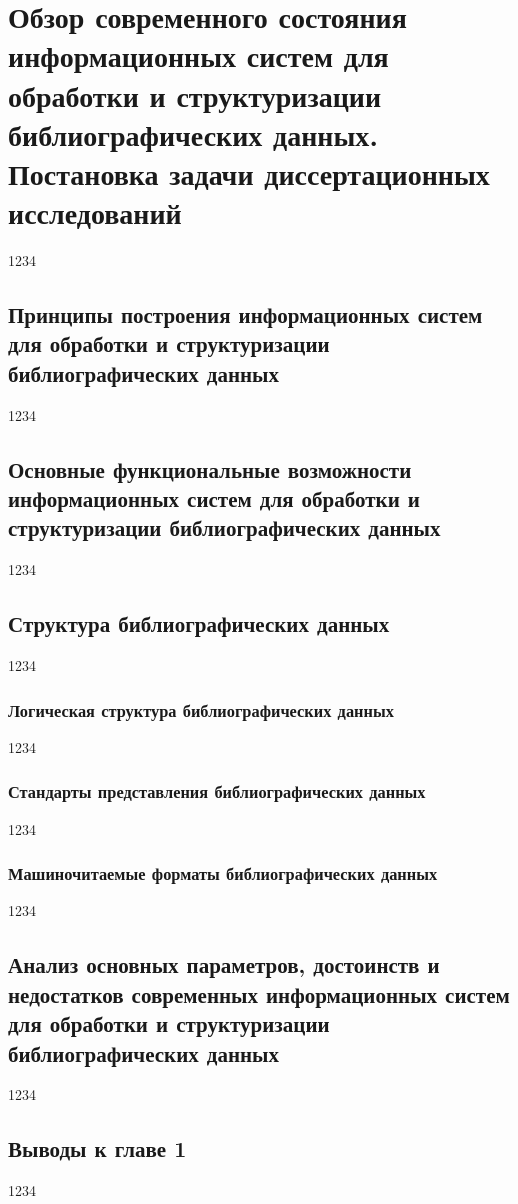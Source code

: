 \chapter{Обзор современного состояния информационных систем для обработки и структуризации библиографических данных. Постановка задачи диссертационных исследований}
1234
\section{Принципы построения информационных систем для обработки и структуризации библиографических данных}
1234
\section{Основные функциональные возможности информационных систем для обработки и структуризации библиографических данных}
1234
\section{Структура библиографических данных}
1234 \cite{Pup09}
\subsection{Логическая структура библиографических данных}
1234 \cite{Pup09}
\subsection{Стандарты представления библиографических данных}
1234
\subsection{Машиночитаемые форматы библиографических данных}
1234
\section{Анализ основных параметров, достоинств и недостатков современных информационных систем для обработки и структуризации библиографических данных}
1234
\section*{Выводы к главе 1}
1234